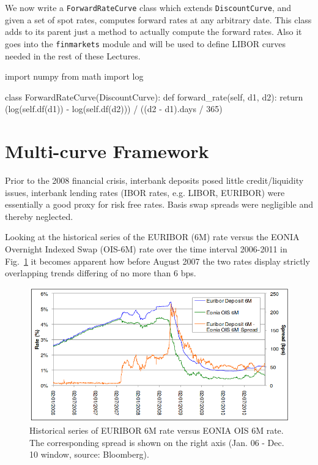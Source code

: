 \begin{finmarkets}
We now write a \texttt{ForwardRateCurve} class which extends \texttt{DiscountCurve}, and given a set of spot rates, computes forward rates at any arbitrary date. This class adds to its parent just a method to actually compute the forward rates. Also it goes into the \texttt{finmarkets} module and will be used to define LIBOR curves needed in the rest of these Lectures.
\end{finmarkets}

\begin{ipython}
import numpy
from math import log

class ForwardRateCurve(DiscountCurve):
    def forward_rate(self, d1, d2):
        return (log(self.df(d1)) - log(self.df(d2))) / ((d2 - d1).days / 365)
\end{ipython}

\section{Multi-curve Framework}
\label{sec:financial-crisis}

Prior to the 2008 financial crisis, interbank deposits posed little credit/liquidity issues, interbank lending rates (IBOR rates, e.g. LIBOR, EURIBOR) were essentially a good proxy for risk free rates. Basis swap spreads were negligible and thereby neglected. 

Looking at the historical series of the EURIBOR (6M) rate versus the EONIA Overnight Indexed Swap (OIS-6M) rate over the time interval 2006-2011 in Fig.~\ref{fig:credit_crunch} it becomes apparent how before August 2007 the two rates display strictly overlapping trends differing of no more than 6 bps.

\begin{figure}[htb]
	\centering
	\includegraphics[width=0.9\linewidth]{figures/credit_crunch.png}
	\caption{Historical series of EURIBOR 6M rate versus EONIA OIS 6M rate. The corresponding spread 
		is shown on the right axis (Jan. 06 - Dec. 10 window, source: Bloomberg).}
	\label{fig:credit_crunch}
\end{figure}

